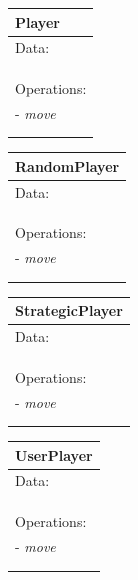 \documentclass[12pt]{article}
\begin{document}
\begin{enumerate}[1.]
    \begin{figure}[H]
        \centering
        \begin{tabular}{|p{3.25cm}|}
            \hline
            \textbf{Player}\\
            \hline
            Data:\\
            \\
            \\
            \\
            \hline
            Operations:\\
            - \textit{move} \\
            \\
            \\
            \hline
        \end{tabular}
        \begin{tabular}{|p{3.25cm}|}
            \hline
            \textbf{RandomPlayer}\\
            \hline
            Data:\\
            \\
            \\
            \\
            \hline
            Operations:\\
            - \textit{move} \\
            \\
            \\
            \hline
        \end{tabular}
        \begin{tabular}{|p{3.25cm}|}
            \hline
            \textbf{StrategicPlayer}\\
            \hline
            Data:\\
            \\
            \\
            \\
            \hline
            Operations:\\
            - \textit{move} \\
            \\
            \\
            \hline
        \end{tabular}
        \begin{tabular}{|p{3.25cm}|}
            \hline
            \textbf{UserPlayer}\\
            \hline
            Data:\\
            \\
            \\
            \\
            \hline
            Operations:\\
            - \textit{move} \\
            \\
            \\
            \hline
        \end{tabular}
    \end{figure}


\end{enumerate}
\end{document}
